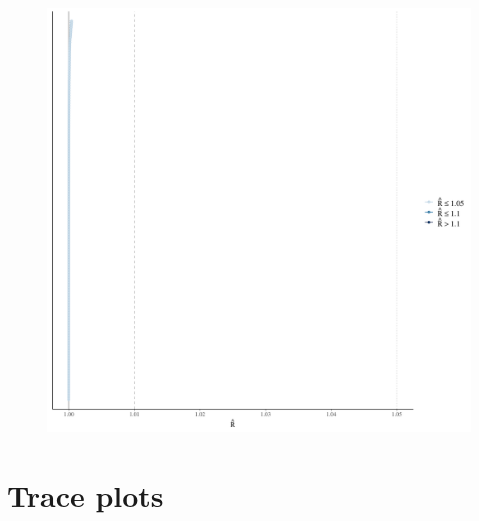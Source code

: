 \documentclass[
]{report}
\begin{document}
\begin{figure}

{\centering \includegraphics[width=1\textwidth,height=\textheight]{diagnostic_plots_files/figure-pdf/unnamed-chunk-13-1.pdf}

}

\end{figure}

\hypertarget{trace-plots-4}{%
\section{Trace plots}\label{trace-plots-4}}
\end{document}
